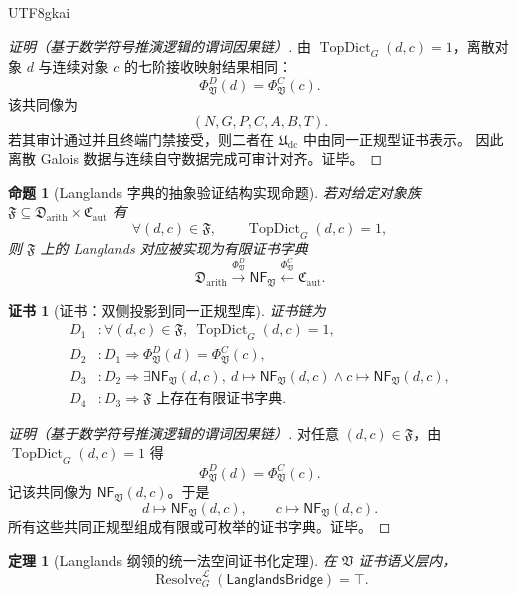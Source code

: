 \documentclass[12pt]{article}
\newtheorem{theorem}{定理}[section]
\newtheorem{proposition}{命题}[section]
\newtheorem{Certificate}{证书}[section]
\newcommand{\Udc}{\mathfrak{U}_{\mathrm{dc}}}
\newcommand{\Vsys}{\mathfrak V}
\newcommand{\NF}{\mathsf{NF}}
\DeclareMathOperator{\Resolve}{Resolve}
\DeclareMathOperator{\TopDict}{TopDict}
\begin{document}
\begin{CJK*}{UTF8}{gkai}
\begin{proof}[证明（基于数学符号推演逻辑的谓词因果链）]
由 \(\TopDict_G(d,c)=1\)，离散对象 \(d\) 与连续对象 \(c\) 的七阶接收映射结果相同：
\[
  \Phi_{\Vsys}^{D}(d)=\Phi_{\Vsys}^{C}(c).
\]
该共同像为
\[
  (N,G,P,C,A,B,T).
\]
若其审计通过并且终端门禁接受，则二者在 \(\Udc\) 中由同一正规型证书表示。
因此离散 Galois 数据与连续自守数据完成可审计对齐。证毕。
\end{proof}

\begin{proposition}[Langlands 字典的抽象验证结构实现命题]
\label{prop:tex59-langlands-dictionary}
若对给定对象族 \(\mathfrak F\subseteq\mathfrak D_{\mathrm{arith}}\times\mathfrak C_{\mathrm{aut}}\) 有
\[
  \forall(d,c)\in\mathfrak F,\qquad
  \TopDict_G(d,c)=1,
\]
则 \(\mathfrak F\) 上的 Langlands 对应被实现为有限证书字典
\[
  \mathfrak D_{\mathrm{arith}}
  \xrightarrow{\Phi_{\Vsys}^{D}}
  \NF_{\Vsys}
  \xleftarrow{\Phi_{\Vsys}^{C}}
  \mathfrak C_{\mathrm{aut}}.
\]
\end{proposition}

\begin{Certificate}[证书：双侧投影到同一正规型库]
\label{cert:tex59-langlands-dictionary}
证书链为
\[
\begin{aligned}
  D_1 &: \forall(d,c)\in\mathfrak F,\ \TopDict_G(d,c)=1,\\
  D_2 &: D_1\Rightarrow
       \Phi_{\Vsys}^{D}(d)=\Phi_{\Vsys}^{C}(c),\\
  D_3 &: D_2\Rightarrow
       \exists \NF_{\Vsys}(d,c),\
       d\mapsto\NF_{\Vsys}(d,c)
       \wedge c\mapsto\NF_{\Vsys}(d,c),\\
  D_4 &: D_3\Rightarrow
       \mathfrak F\text{ 上存在有限证书字典}.
\end{aligned}
\]
\end{Certificate}

\begin{proof}[证明（基于数学符号推演逻辑的谓词因果链）]
对任意 \((d,c)\in\mathfrak F\)，由 \(\TopDict_G(d,c)=1\) 得
\[
  \Phi_{\Vsys}^{D}(d)=\Phi_{\Vsys}^{C}(c).
\]
记该共同像为 \(\NF_{\Vsys}(d,c)\)。于是
\[
  d\mapsto\NF_{\Vsys}(d,c),
  \qquad
  c\mapsto\NF_{\Vsys}(d,c).
\]
所有这些共同正规型组成有限或可枚举的证书字典。证毕。
\end{proof}

\begin{theorem}[Langlands 纲领的统一法空间证书化定理]
\label{thm:tex59-langlands-resolution}
在 \(\Vsys\) 证书语义层内，
\[
  \Resolve_G^{\mathcal L}(\mathsf{LanglandsBridge})=\top.
\]
\end{theorem}


\end{CJK*}
\end{document}
